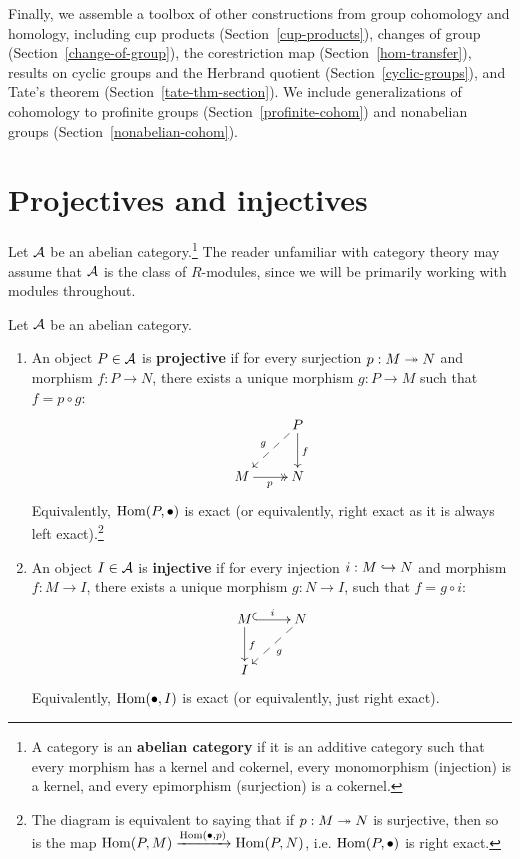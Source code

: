 Finally, we assemble a toolbox of other constructions from group cohomology and homology, including cup products (Section~\ref{cup-products}), changes of group (Section~\ref{change-of-group}), the corestriction map (Section~\ref{hom-transfer}), results on cyclic groups and the Herbrand quotient (Section~\ref{cyclic-groups}), and Tate's theorem (Section~\ref{tate-thm-section}). We include generalizations of cohomology to profinite groups (Section~\ref{profinite-cohom}) and nonabelian groups (Section~\ref{nonabelian-cohom}).

\section{Projectives and injectives}
Let $\cal A$ be an abelian category.\footnote{A category is an \textbf{abelian category} if it is an additive category such that every morphism has a kernel and cokernel, every monomorphism (injection) is a kernel, and every epimorphism (surjection) is a cokernel.} %
The reader unfamiliar with category theory may assume that $\cal A$ is the class of $R$-modules, since we will be primarily working with modules throughout. 
\begin{df}
Let $\cal A$ be an abelian category.
\begin{enumerate}
\item An object $P\in \cal A$ is \textbf{projective} if for every surjection $p:M\tra N$ and morphism $f:P\to N$, there exists a unique morphism $g:P\to M$ such that $f=p\circ g$:
\[
\xymatrix{
& P\ar@{-->}[ld]_{g}\ar[d]^{f}\\
M\ar@{->>}[r]_p& N
}
\]
Equivalently, $\Hom(P,\bullet)$ is exact (or equivalently, right exact as it is always left exact).\footnote{The diagram is equivalent to saying that if $p:M\tra N$ is surjective, then so is the map $\Hom(P,M)\xra{\Hom(\bullet,p)} \Hom(P,N)$, i.e. $\Hom(P,\bullet)$ is right exact.}
\item An object $I\in \cal A$ is \textbf{injective} if for every injection $i:M\hra N$ and morphism $f:M\to I$, there exists a unique morphism $g:N\to I$, such that $f=g\circ i$:
\[
\xymatrix{
M\ar[d]^f\ar@{^(->}[r]^{i} &N \ar@{-->}[ld]^{g}\\
I&
}
\]
Equivalently, $\Hom(\bullet,I)$ is exact (or equivalently, just right exact).
\end{enumerate}
\end{df}
